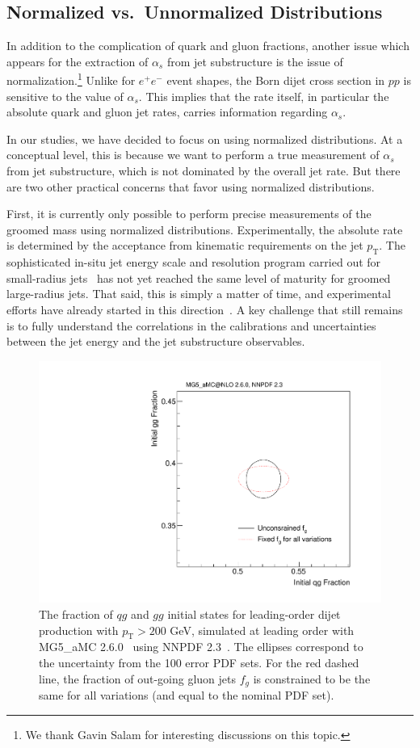 \subsection{Normalized vs.\ Unnormalized Distributions}
\label{subsec:norm}

In addition to the complication of quark and gluon fractions, another issue which appears for the extraction of $\alpha_s$ from jet substructure is the issue of normalization.\footnote{We thank Gavin Salam for interesting discussions on this topic. }
%
Unlike for $e^+e^-$ event shapes, the Born dijet cross section in $pp$ is sensitive to the value of $\alpha_s$.
%
This implies that the rate itself, in particular the absolute quark and gluon jet rates, carries information regarding $\alpha_s$. 

In our studies, we have decided to focus on using normalized distributions.
%
At a conceptual level, this is because we want to perform a true measurement of $\alpha_s$ from jet substructure, which is not dominated by the overall jet rate.
%
But there are two other practical concerns that favor using normalized distributions.

First, it is currently only possible to perform precise measurements of the groomed mass using normalized distributions.
%
Experimentally, the absolute rate is determined by the acceptance from kinematic requirements on the jet $p_\text{T}$.
%
The sophisticated in-situ jet energy scale and resolution program carried out for small-radius jets~\cite{Aad:2014bia,Aaboud:2017jcu,Khachatryan:2016kdb,CMS-DP-2016-020} has not yet reached the same level of maturity for groomed large-radius jets.
%
That said, this is simply a matter of time, and experimental efforts have already started in this direction~\cite{ATLAS-CONF-2017-063}.
%
A key challenge that still remains is to fully understand the correlations in the calibrations and uncertainties between the jet energy and the jet substructure observables.

\begin{figure}[t]
\begin{center}
\includegraphics[width = 0.5\columnwidth]{figures/PDFs.pdf}
\end{center}
\caption{The fraction of $qg$ and $gg$ initial states for leading-order dijet production with $p_\text{T}>200$ GeV, simulated at leading order with MG5\_aMC 2.6.0~\cite{Alwall:2014hca} using NNPDF 2.3~\cite{Ball:2012cx}.  The ellipses correspond to the uncertainty from the 100 error PDF sets.  For the red dashed line, the fraction of out-going gluon jets $f_g$ is constrained to be the same for all variations (and equal to the nominal PDF set).}
\label{fig:pdf}
\end{figure}

